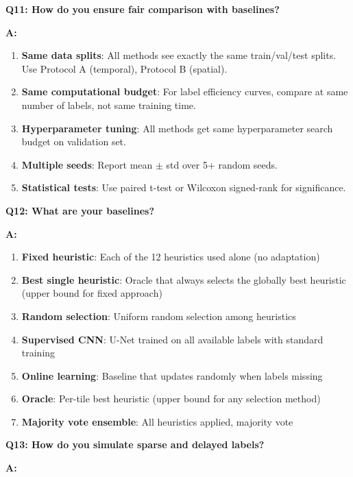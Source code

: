 \documentclass[11pt]{article}
\begin{document}
\textbf{Q11: How do you ensure fair comparison with baselines?}

\textbf{A:}

\begin{enumerate}
    \item \textbf{Same data splits}: All methods see exactly the same train/val/test splits. Use Protocol A (temporal), Protocol B (spatial).

    \item \textbf{Same computational budget}: For label efficiency curves, compare at same number of labels, not same training time.

    \item \textbf{Hyperparameter tuning}: All methods get same hyperparameter search budget on validation set.

    \item \textbf{Multiple seeds}: Report mean $\pm$ std over 5+ random seeds.

    \item \textbf{Statistical tests}: Use paired t-test or Wilcoxon signed-rank for significance.
\end{enumerate}

\textbf{Q12: What are your baselines?}

\textbf{A:}

\begin{enumerate}
    \item \textbf{Fixed heuristic}: Each of the 12 heuristics used alone (no adaptation)
    \item \textbf{Best single heuristic}: Oracle that always selects the globally best heuristic (upper bound for fixed approach)
    \item \textbf{Random selection}: Uniform random selection among heuristics
    \item \textbf{Supervised CNN}: U-Net trained on all available labels with standard training
    \item \textbf{Online learning}: Baseline that updates randomly when labels missing
    \item \textbf{Oracle}: Per-tile best heuristic (upper bound for any selection method)
    \item \textbf{Majority vote ensemble}: All heuristics applied, majority vote
\end{enumerate}

\textbf{Q13: How do you simulate sparse and delayed labels?}

\textbf{A:}
\end{document}

